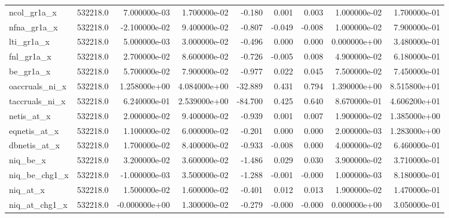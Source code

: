 \documentclass[12pt]{article}
\begin{document}
\begin{landscape}
\begin{longtable}{|l|r|r|r|r|r|r|r|r|}
ncol\_gr1a\_x            &  532218.0 &  7.000000e-03 &  1.700000e-02 &      -0.180 &        0.001 &        0.003 &  1.000000e-02 &  1.700000e-01 \\
nfna\_gr1a\_x            &  532218.0 & -2.100000e-02 &  9.400000e-02 &      -0.807 &       -0.049 &       -0.008 &  1.000000e-02 &  7.900000e-01 \\
lti\_gr1a\_x             &  532218.0 &  5.000000e-03 &  3.000000e-02 &      -0.496 &        0.000 &        0.000 &  0.000000e+00 &  3.480000e-01 \\
fnl\_gr1a\_x             &  532218.0 &  2.700000e-02 &  8.600000e-02 &      -0.726 &       -0.005 &        0.008 &  4.900000e-02 &  6.180000e-01 \\
be\_gr1a\_x              &  532218.0 &  5.700000e-02 &  7.900000e-02 &      -0.977 &        0.022 &        0.045 &  7.500000e-02 &  7.450000e-01 \\
oaccruals\_ni\_x         &  532218.0 &  1.258000e+00 &  4.084000e+00 &     -32.889 &        0.431 &        0.794 &  1.390000e+00 &  8.515800e+01 \\
taccruals\_ni\_x         &  532218.0 &  6.240000e-01 &  2.539000e+00 &     -84.700 &        0.425 &        0.640 &  8.670000e-01 &  4.606200e+01 \\
netis\_at\_x             &  532218.0 &  2.000000e-02 &  9.400000e-02 &      -0.939 &        0.001 &        0.007 &  1.900000e-02 &  1.385000e+00 \\
eqnetis\_at\_x           &  532218.0 &  1.100000e-02 &  6.000000e-02 &      -0.201 &        0.000 &        0.000 &  2.000000e-03 &  1.283000e+00 \\
dbnetis\_at\_x           &  532218.0 &  1.700000e-02 &  8.400000e-02 &      -0.933 &       -0.008 &        0.000 &  4.000000e-02 &  6.460000e-01 \\
niq\_be\_x               &  532218.0 &  3.200000e-02 &  3.600000e-02 &      -1.486 &        0.029 &        0.030 &  3.900000e-02 &  3.710000e-01 \\
niq\_be\_chg1\_x          &  532218.0 & -1.000000e-03 &  3.500000e-02 &      -1.288 &       -0.001 &       -0.000 &  1.000000e-03 &  8.180000e-01 \\
niq\_at\_x               &  532218.0 &  1.500000e-02 &  1.600000e-02 &      -0.401 &        0.012 &        0.013 &  1.900000e-02 &  1.470000e-01 \\
niq\_at\_chg1\_x          &  532218.0 & -0.000000e+00 &  1.300000e-02 &      -0.279 &       -0.000 &       -0.000 &  0.000000e+00 &  3.050000e-01 \\

\end{longtable}
\end{landscape}
\end{document}
